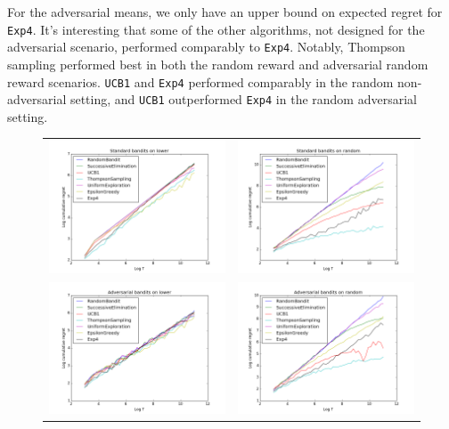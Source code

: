 \documentclass[10pt]{article}
\begin{document}
For the adversarial means, we only have an upper bound on expected regret for
\verb'Exp4'. It's interesting that some of the other algorithms, not designed
for the adversarial scenario, performed comparably to \verb'Exp4'. Notably,
Thompson sampling performed best in both the random reward and adversarial
random reward scenarios. \verb'UCB1' and \verb'Exp4' performed comparably in the
random non-adversarial setting, and \verb'UCB1' outperformed \verb'Exp4' in the
random adversarial setting.

\begin{figure}[!ht]
    \center
    \begin{tabular}{cc}
        \includegraphics[width=7cm]{"plots/standard-all-lower-numTs-45"} &
        \includegraphics[width=7cm]{"plots/standard-all-random-numTs-45"} \\
        \includegraphics[width=7cm]{"plots/adversarial-all-lower-numTs-45"} &
        \includegraphics[width=7cm]{"plots/adversarial-all-random-numTs-45"} \\

\end{tabular}
\end{figure}
\end{document}
